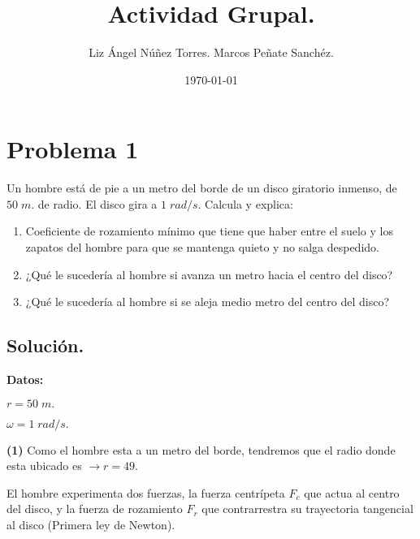 \documentclass[a4paper,12pt]{article} %
\title{Actividad Grupal.}
\author{Liz Ángel Núñez Torres.
Marcos Peñate Sanchéz.}
\date{\today}
\begin{document}
\maketitle 

\section*{Problema 1} %

\begin{justify}
    Un hombre está de pie a un metro del borde de un disco giratorio inmenso, de \(50 \; m.\) de radio. El disco gira a \(1 \; rad/s.\) Calcula y explica:
\end{justify}

\begin{enumerate}
    \item Coeficiente de rozamiento mínimo que tiene que haber entre el suelo y los zapatos del hombre para que se mantenga quieto y no salga despedido.
    \item ¿Qué le sucedería al hombre si avanza un metro hacia el centro del disco?
    \item ¿Qué le sucedería al hombre si se aleja medio metro del centro del disco?
\end{enumerate}

\vspace{\baselineskip}

\subsection*{Solución.}

\begin{justify}
    \textbf{Datos:}
\end{justify}

\begin{multicols}{2}
    \(r = 50 \; m.\)
    
\columnbreak
    \(\omega = 1 \; rad/s.\)
    
\end{multicols}

\begin{justify}
    \textbf{(1)} Como el hombre esta a un metro del borde, tendremos que el radio donde esta ubicado es \(\rightarrow r = 49.\)
\end{justify}

\begin{justify}
    El hombre experimenta dos fuerzas, la fuerza centrípeta \(F_c\) que actua al centro del disco, y la fuerza de rozamiento \(F_r\) que contrarrestra su trayectoria tangencial al disco (Primera ley de Newton).
\end{justify}
\end{document}
